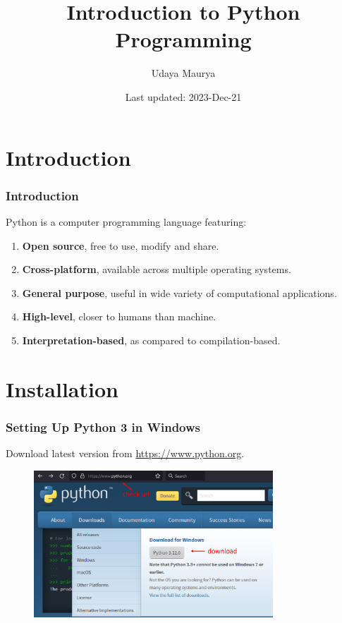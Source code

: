 \documentclass{beamer}
\begin{document}
\title{Introduction to Python Programming}
\author{Udaya Maurya}
\date{Last updated: 2023-Dec-21}

\frame{\titlepage}


\section{Introduction}

\begin{frame}
\frametitle{Introduction}
Python is a computer programming language featuring:
\begin{enumerate}
\item \textbf{Open source}, free to use, modify and share.
\item \textbf{Cross-platform}, available across multiple operating systems.
\item \textbf{General purpose}, useful in wide variety of computational applications.
\item \textbf{High-level}, closer to humans than machine.
\item \textbf{Interpretation-based}, as compared to compilation-based.
\end{enumerate}
\end{frame}

\section{Installation}

\begin{frame}
\frametitle{Setting Up Python 3 in Windows}
Download latest version from \href{https://www.python.org}{https://www.python.org}.
\begin{figure}[H]
\centering
\includegraphics[width=0.8\textwidth]{images/0_python.org.png}
\end{figure}
\end{frame}
\end{document}
